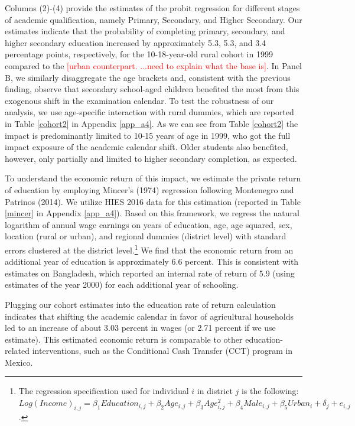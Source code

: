 \documentclass[12pt,letterpaper]{article}\usepackage[margin=1in]{geometry}
\newcommand{\SAdded}[1]{\textcolor{red}{#1}}
\newcommand{\0}{\ensuremath{\mbox{\boldmath $0$}}}
\begin{document}
\hfil


Columns (2)-(4) provide the estimates of the probit regression for different stages of academic qualification, namely Primary, Secondary, and Higher Secondary. Our estimates indicate that the probability of completing primary, secondary, and higher secondary education increased by approximately 5.3, 5.3, and 3.4 percentage points, respectively, for the 10-18-year-old rural cohort in 1999 compared to the \SAdded{[urban counterpart. ...need to explain what the base is]}. In Panel B, we similarly disaggregate the age brackets and, consistent with the previous finding, observe that secondary school-aged children benefited the most from this exogenous shift in the examination calendar. To test the robustness of our analysis, we use age-specific interaction with rural dummies, which are reported in Table \ref{cohort2} in Appendix \ref{app_a4}. As we can see from Table \ref{cohort2} the impact is predominantly limited to 10-15 years of age in 1999, who got the full impact exposure of the academic calendar shift. Older students also benefited, however, only partially and limited to higher secondary completion, as expected. 

To understand the economic return of this impact, we estimate the private return of education by employing Mincer's (1974) regression following Montenegro and Patrinos (2014). We utilize HIES 2016 data for this estimation (reported in Table \ref{mincer} in Appendix \ref{app_a4}). Based on this framework, we regress the natural logarithm of annual wage earnings on years of education, age, age squared, sex, location (rural or urban), and regional dummies (district level) with standard errors clustered at the district level.\footnote{The regression specification used for individual $i$ in district $j$ is the following: $Log(Income)_{i,j}=\beta_{1}Education_{i,j}+\beta_{2}Age_{i,j}+\beta_{3}Age^{2}_{i,j}+\beta_{4}Male_{i,j}+\beta_{5}Urban_{i}+\delta_{j}+e_{i,j}$.}
We find that the economic return from an additional year of education is approximately 6.6 percent. This is consistent with \cite{montenegro2014comparable} estimates on Bangladesh, which reported an internal rate of return of 5.9 (using estimates of the year 2000) for each additional year of schooling. 

Plugging our cohort estimates into the education rate of return calculation indicates that shifting the academic calendar in favor of agricultural households led to an increase of about 3.03 percent in wages (or 2.71 percent if we use \cite{montenegro2014comparable} estimate). This estimated economic return is comparable to other education-related interventions, such as the Conditional Cash Transfer (CCT) program in Mexico.
\end{document}
